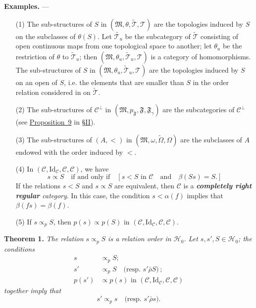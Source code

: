 \documentclass[a4paper,oneside,nobib,nofonts,notitlepage,notoc,nols,fleqn,justified]{tufte-book}
\newenvironment{itenv}[1]
  {\phantomsection\par\medskip\noindent\textbf{#1.}\itshape}
  {\par\medskip}
\newenvironment{rmenv}[1]
  {\phantomsection\par\medskip\noindent\textbf{#1.}\rmfamily}
  {\par\medskip}
\newcommand{\oldpage}[1]{{\reversemarginpar\marginnote{\raggedleft\footnotesize\textit{p.~#1}}}}
\newcommand{\unsure}[1]{{\color{purple}\textbf{#1}}}
\newcommand{\CC}{\mathcal{C}}
\newcommand{\HH}{\mathcal{H}}
\newcommand{\MM}{\mathfrak{M}}
\newcommand{\FF}{\mathfrak{F}}
\newcommand{\TT}{\mathcal{T}}
\newcommand{\relrhobar}{\mathrel{\bar{\rho}}}
\newcommand{\subs}{\mathrel{\propto}}
\newcommand{\Id}{\mathrm{Id}}
\begin{document}
\begin{rmenv}{Examples}
  ---
  \begin{enumerate}
    \item[\normalfont(1)]
      The sub-structures of $S$ in $(\MM,\theta,\widetilde{\TT},\TT)$ are the topologies induced by $S$ on the subclasses of $\theta(S)$.
      Let $\widetilde{\TT_u}$ be the subcategory of $\widetilde{\TT}$ consisting of open continuous maps from one topological space to another;
      let $\theta_u$ be the restriction of $\theta$ to $\widetilde{\TT}_u$;
      then $(\MM,\theta_u,\widetilde{\TT}_u,\TT)$ is a category of homomorphisms.
      The sub-structures of $S$ in $(\MM,\theta_u,\widetilde{\TT}_u,\TT)$ are the topologies induced by $S$ on an open of $S$, i.e. the elements that are smaller than $S$ in the order relation considered in \cite{3c} on $\widetilde{\TT}$.
    \item[\normalfont(2)]
      The sub-structures of $\CC^\perp$ in $(\MM,p_\FF,\FF,\FF_\gamma)$ are the subcategories of $\CC^\perp$ (see \hyperref[proposition:i-9]{Proposition~9} in \hyperref[section:ii]{§II}).
    \item[\normalfont(3)]
      The sub-structures of $(A,<)$ in $(\MM,\omega,\widetilde{\Omega},\Omega)$ are the subclasses of $A$ endowed with the order induced by $<$.
    \item[\normalfont(4)]
      In $(\CC,\Id_\CC,\CC,\CC)$, we have
      \[
        s\subs S
        \quad\text{if and only if}\quad
        [
          \text{$s<S$ in $\CC$}
          \quad\text{and}\quad
          \beta(Ss)=S.
        ]
      \]
      If the relations $s<S$ and $s\subs S$ are equivalent, then $\CC$ is a \emph{\unsure{completely right regular} category}.
      In this case, the condition $s<\alpha(f)$ implies that $\beta(fs)=\beta(f)$.
    \item[\normalfont(5)]
      If $s\subs_p S$, then $p(s)\subs p(S)$ in $(\CC,\Id_\CC,\CC,\CC)$.
  \end{enumerate}
\end{rmenv}

\begin{itenv}{Theorem 1}
\label{theorem:1}
  \oldpage{362}
  The relation $s\subs_p S$ is a relation order in $\HH_0$.
  Let $s,s',S\in\HH_0$;
  the conditions
  \[
    \begin{aligned}
      s&\subs_p S;
    \\s'&\subs_p S
      \quad\text{(resp. $s'\relrhobar S$)}\,;
    \\p(s')&\subs p(s)\text{ in }(\CC,\Id_\CC,\CC,\CC)
    \end{aligned}
  \]
  together imply that
  \[
    s'\subs_p s
    \quad\text{(resp. $s'\relrhobar s$)}.
  \]
\end{itenv}
\end{document}

